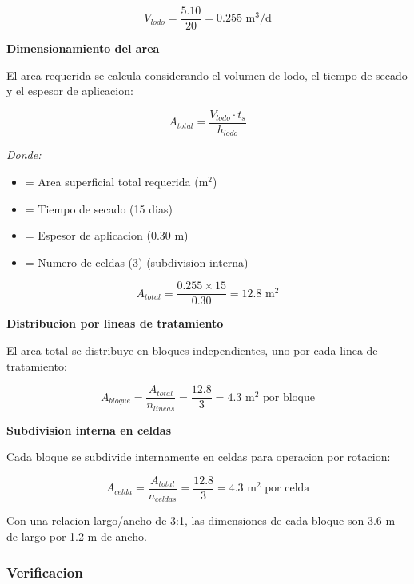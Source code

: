 \documentclass[12pt,a4paper]{article}
\begin{document}
\begin{equation}
V_{lodo} = \frac{5.10}{20} = 0.255 \text{ m}^3\text{/d}
\end{equation}

\textbf{Dimensionamiento del area}

El area requerida se calcula considerando el volumen de lodo, el tiempo de secado y el espesor de aplicacion:

\begin{equation}
A_{total} = \frac{V_{lodo} \cdot t_s}{h_{lodo}}
\end{equation}

\textit{Donde:}
\begin{itemize}[noitemsep,leftmargin=2em]
    \item[$A_{total}$] = Area superficial total requerida (m$^2$)
    \item[$t_s$] = Tiempo de secado (15 dias)
    \item[$h_{lodo}$] = Espesor de aplicacion (0.30 m)
    \item[$n_{celdas}$] = Numero de celdas (3) (subdivision interna)
\end{itemize}

\begin{equation}
A_{total} = \frac{0.255 \times 15}{0.30} = 12.8 \text{ m}^2
\end{equation}

\textbf{Distribucion por lineas de tratamiento}

El area total se distribuye en bloques independientes, uno por cada linea de tratamiento:

\begin{equation}
A_{bloque} = \frac{A_{total}}{n_{lineas}} = \frac{12.8}{3} = 4.3 \text{ m}^2 \text{ por bloque}
\end{equation}

\textbf{Subdivision interna en celdas}

Cada bloque se subdivide internamente en celdas para operacion por rotacion:

\begin{equation}
A_{celda} = \frac{A_{total}}{n_{celdas}} = \frac{12.8}{3} = 4.3 \text{ m}^2 \text{ por celda}
\end{equation}

Con una relacion largo/ancho de 3:1, las dimensiones de cada bloque son 3.6 m de largo por 1.2 m de ancho.

\subsubsection{Verificacion}
\end{document}
